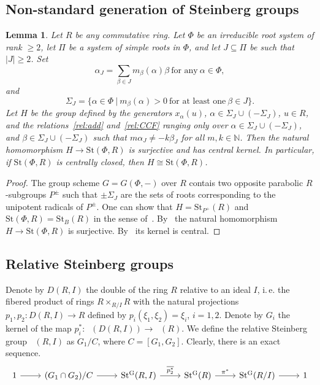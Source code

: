 \documentclass[oneside,12pt]{amsart}
\numberwithin{equation}{section}
\newtheorem{lem}{Lemma}
\numberwithin{lem}{section}
\theoremstyle{definition}
\theoremstyle{remark}
\DeclareMathOperator{\St}{St^G}
\newcommand{\Stb}{\mathrm{St}}
\begin{document}
\subsection{Non-standard generation of Steinberg groups}


\begin{lem}\label{lem:parab-gen}
Let $R$ be any commutative ring. Let $\Phi$ be an irreducible root system of rank $\ge 2$, let $\Pi$ be a system of simple roots in $\Phi$,
and let $J\subseteq\Pi$ be such that $|J|\ge 2$. Set
$$
\alpha_J=\sum\limits_{\beta\in J}m_\beta(\alpha)\beta\ \mbox{for any}\ \alpha\in\Phi,
$$
and
$$
\Sigma_J=\{\alpha\in\Phi\ |\ m_\beta(\alpha)>0\ \mbox{for at least one}\ \beta\in J\}.
$$
Let $H$ be the group defined by the generators $x_\alpha(u)$, $\alpha\in\Sigma_J\cup(-\Sigma_J)$,
$u\in R$, and the relations~\eqref{rel:add} and~\eqref{rel:CCF} ranging only over
$\alpha\in\Sigma_J\cup(-\Sigma_J)$, and
$\beta\in\Sigma_J\cup(-\Sigma_J)$ such that $m\alpha_J\neq-k\beta_J$ for all $m,k\in\mathbb{N}$.
Then the natural homomorphism $H\to\Stb(\Phi,R)$ is surjective
and has central kernel. In particular, if $\Stb(\Phi,R)$ is centrally closed, then $H\cong\Stb(\Phi,R)$.
\end{lem}
\begin{proof}
The group scheme $G=G(\Phi,-)$ over $R$ contais two opposite parabolic $R$-subgroups $P^\pm$ such that
$\pm\Sigma_J$ are the sets of roots corresponding to the unipotent radicals of $P^\pm$. One can show that
$H=\Stb_{P^+}(R)$ and $\Stb(\Phi,R)=\Stb_B(R)$ in the sense of~\cite{St-cong}.
 By~\cite[Lemma 8]{St-cong}
the natural homomorphism $H\to\Stb(\Phi,R)$ is surjective. By~\cite[Lemma 14]{St-cong} its kernel is central.

\end{proof}




\subsection{Relative Steinberg groups}



Denote by $D(R, I)$ the double of the ring $R$ relative to an ideal $I$, i.\,e. the fibered product of rings
$R \times_{R/I} R$ with the natural projections $p_1, p_2 \colon D(R, I) \to R$ defined by $p_i(\xi_1, \xi_2) = \xi_i$, $i=1,2$.
Denote by $G_i$ the kernel of the map $p_i^*\colon\St(D(R, I)) \to \St(R)$.
We define the relative Steinberg group $\St(R, I)$ as $G_1 / C$, where $C = [G_1, G_2]$.
Clearly, there is an exact sequence.
\begin{equation} \label{eq:suite} \begin{tikzcd} 1 \ar[r] & (G_1\cap G_2)/C \ar[r] & \St(R, I) \ar[r, "\overline{p_2^*}"] & \St(R) \ar[r, "\pi^*"] & \St(R/I) \ar[r] & 1 \end{tikzcd} \end{equation}
\end{document}

